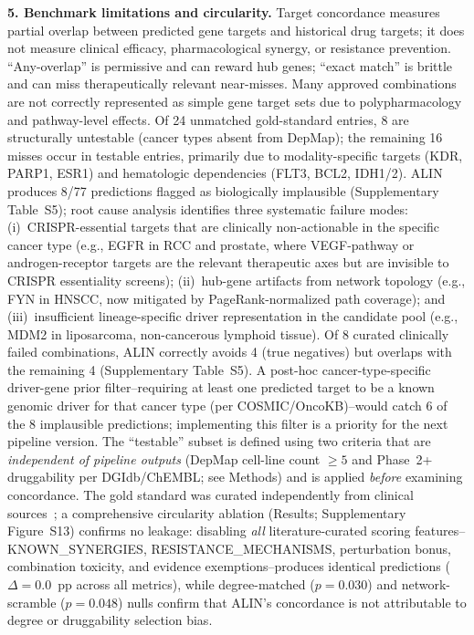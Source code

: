 \documentclass[times, twoside, watermark]{zHenriquesLab-StyleBioRxiv}
\begin{document}
\textbf{5. Benchmark limitations and circularity.} Target concordance measures partial overlap between predicted gene targets and historical drug targets; it does not measure clinical efficacy, pharmacological synergy, or resistance prevention. ``Any-overlap'' is permissive and can reward hub genes; ``exact match'' is brittle and can miss therapeutically relevant near-misses. Many approved combinations are not correctly represented as simple gene target sets due to polypharmacology and pathway-level effects. Of 24 unmatched gold-standard entries, 8 are structurally untestable (cancer types absent from DepMap); the remaining 16 misses occur in testable entries, primarily due to modality-specific targets (KDR, PARP1, ESR1) and hematologic dependencies (FLT3, BCL2, IDH1/2). ALIN produces 8/77 predictions flagged as biologically implausible (Supplementary Table~S5); root cause analysis identifies three systematic failure modes: (i)~CRISPR-essential targets that are clinically non-actionable in the specific cancer type (e.g., EGFR in RCC and prostate, where VEGF-pathway or androgen-receptor targets are the relevant therapeutic axes but are invisible to CRISPR essentiality screens); (ii)~hub-gene artifacts from network topology (e.g., FYN in HNSCC, now mitigated by PageRank-normalized path coverage); and (iii)~insufficient lineage-specific driver representation in the candidate pool (e.g., MDM2 in liposarcoma, non-cancerous lymphoid tissue). Of 8 curated clinically failed combinations, ALIN correctly avoids 4 (true negatives) but overlaps with the remaining 4 (Supplementary Table~S5). A post-hoc cancer-type-specific driver-gene prior filter--requiring at least one predicted target to be a known genomic driver for that cancer type (per COSMIC/OncoKB)--would catch 6 of the 8 implausible predictions; implementing this filter is a priority for the next pipeline version. The ``testable'' subset is defined using two criteria that are \emph{independent of pipeline outputs} (DepMap cell-line count $\geq 5$ and Phase~2+ druggability per DGIdb/ChEMBL; see Methods) and is applied \emph{before} examining concordance. The gold standard was curated independently from clinical sources~\cite{Long2014,Kopetz2019,Turner2015,Daver2022}; a comprehensive circularity ablation (Results; Supplementary Figure~S13) confirms no leakage: disabling \emph{all} literature-curated scoring features--KNOWN\_SYNERGIES, RESISTANCE\_MECHANISMS, perturbation bonus, combination toxicity, and evidence exemptions--produces identical predictions ($\Delta = 0.0$~pp across all metrics), while degree-matched ($p = 0.030$) and network-scramble ($p = 0.048$) nulls confirm that ALIN's concordance is not attributable to degree or druggability selection bias.
\end{document}
